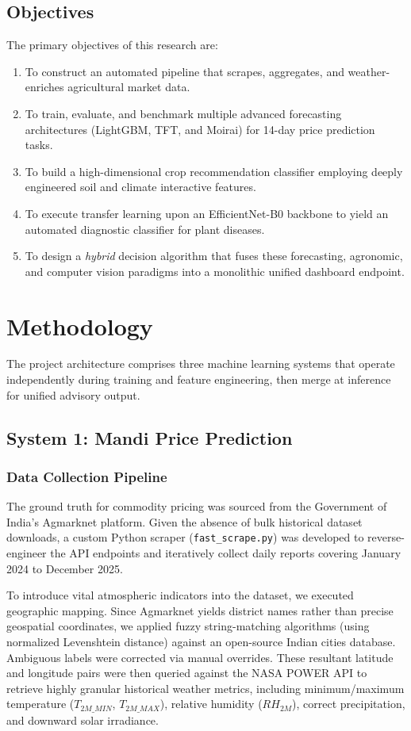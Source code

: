 \documentclass[conference]{IEEEtran}
\begin{document}
\subsection{Objectives}
The primary objectives of this research are:
\begin{enumerate}
    \item To construct an automated pipeline that scrapes, aggregates, and weather-enriches agricultural market data.
    \item To train, evaluate, and benchmark multiple advanced forecasting architectures (LightGBM, TFT, and Moirai) for 14-day price prediction tasks.
    \item To build a high-dimensional crop recommendation classifier employing deeply engineered soil and climate interactive features.
    \item To execute transfer learning upon an EfficientNet-B0 backbone to yield an automated diagnostic classifier for plant diseases.
    \item To design a \emph{hybrid} decision algorithm that fuses these forecasting, agronomic, and computer vision paradigms into a monolithic unified dashboard endpoint.
\end{enumerate}

\section{Methodology}

The project architecture comprises three machine learning systems that operate independently during training and feature engineering, then merge at inference for unified advisory output.

\subsection{System 1: Mandi Price Prediction}

\subsubsection{Data Collection Pipeline}
The ground truth for commodity pricing was sourced from the Government of India's Agmarknet platform. Given the absence of bulk historical dataset downloads, a custom Python scraper (\texttt{fast\_scrape.py}) was developed to reverse-engineer the API endpoints and iteratively collect daily reports covering January 2024 to December 2025. 

To introduce vital atmospheric indicators into the dataset, we executed geographic mapping. Since Agmarknet yields district names rather than precise geospatial coordinates, we applied fuzzy string-matching algorithms (using normalized Levenshtein distance) against an open-source Indian cities database. Ambiguous labels were corrected via manual overrides. These resultant latitude and longitude pairs were then queried against the NASA POWER API to retrieve highly granular historical weather metrics, including minimum/maximum temperature ($T_{2M\_MIN}$, $T_{2M\_MAX}$), relative humidity ($RH_{2M}$), correct precipitation, and downward solar irradiance.
\end{document}
